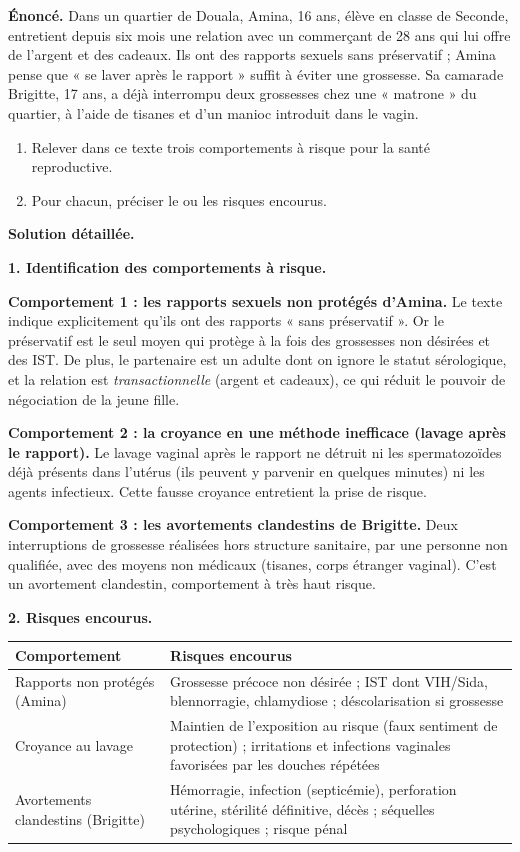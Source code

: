 \documentclass[11pt]{article}
\begin{document}
\begin{exoresolu}
\textbf{Énoncé.} Dans un quartier de Douala, Amina, 16 ans, élève en classe de Seconde, entretient depuis six mois une relation avec un commerçant de 28 ans qui lui offre de l'argent et des cadeaux. Ils ont des rapports sexuels sans préservatif ; Amina pense que « se laver après le rapport » suffit à éviter une grossesse. Sa camarade Brigitte, 17 ans, a déjà interrompu deux grossesses chez une « matrone » du quartier, à l'aide de tisanes et d'un manioc introduit dans le vagin.
\begin{enumerate}
\item Relever dans ce texte trois comportements à risque pour la santé reproductive.
\item Pour chacun, préciser le ou les risques encourus.
\end{enumerate}
\tcblower
\textbf{Solution détaillée.}

\textbf{1. Identification des comportements à risque.}

\textbf{Comportement 1 : les rapports sexuels non protégés d'Amina.} Le texte indique explicitement qu'ils ont des rapports « sans préservatif ». Or le préservatif est le seul moyen qui protège à la fois des grossesses non désirées et des IST. De plus, le partenaire est un adulte dont on ignore le statut sérologique, et la relation est \emph{transactionnelle} (argent et cadeaux), ce qui réduit le pouvoir de négociation de la jeune fille.

\textbf{Comportement 2 : la croyance en une méthode inefficace (lavage après le rapport).} Le lavage vaginal après le rapport ne détruit ni les spermatozoïdes déjà présents dans l'utérus (ils peuvent y parvenir en quelques minutes) ni les agents infectieux. Cette fausse croyance entretient la prise de risque.

\textbf{Comportement 3 : les avortements clandestins de Brigitte.} Deux interruptions de grossesse réalisées hors structure sanitaire, par une personne non qualifiée, avec des moyens non médicaux (tisanes, corps étranger vaginal). C'est un avortement clandestin, comportement à très haut risque.

\textbf{2. Risques encourus.}

\begin{center}
\begin{tabularx}{\linewidth}{|l|X|}
\hline
\rowcolor{popblueL} \textbf{Comportement} & \textbf{Risques encourus} \\
\hline
Rapports non protégés (Amina) & Grossesse précoce non désirée ; IST dont VIH/Sida, blennorragie, chlamydiose ; déscolarisation si grossesse \\
\hline
Croyance au lavage & Maintien de l'exposition au risque (faux sentiment de protection) ; irritations et infections vaginales favorisées par les douches répétées \\
\hline
Avortements clandestins (Brigitte) & Hémorragie, infection (septicémie), perforation utérine, stérilité définitive, décès ; séquelles psychologiques ; risque pénal \\
\hline
\end{tabularx}
\end{center}


\end{exoresolu}
\end{document}
